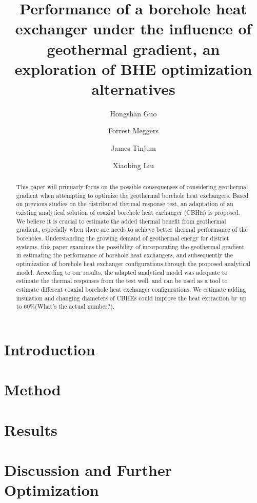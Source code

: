 \documentclass[3p]{elsarticle/elsarticle}
\begin{document}
\begin{frontmatter}
\title{Performance of a borehole heat exchanger under the influence of geothermal gradient, an exploration of BHE optimization alternatives}
\author[Group1]{Hongshan Guo}



\author[Group2]{Forrest Meggers}


\author[Group3]{James Tinjum}
\author[Group4]{Xiaobing Liu}

\address[Group1]{Andlinger Center for Energy and the Environment, Princeton University, Princeton, United States}
\address[Group2]{School of Architecture, Princeton University, Princeton, United States}



\begin{abstract}
This paper will primiarly focus on the possible consequenses of considering geothermal gradient when attempting to optimize the geothermal borehole heat exchangers. Based on previous studies on the distributed thermal response test, an adaptation of an existing analytical solution of coaxial borehole heat exchanger (CBHE) is proposed. We believe it is crucial to estimate the added thermal benefit from geothermal gradient, especially when there are needs to achieve better thermal performance of the boreholes. Understanding the growing demand of geothermal energy for district systems, this paper examines the possibility of incorporating the geothermal gradient in estimating the performance of borehole heat exchangers, and subsequently the optimization of borehole heat exchanger configurations through the proposed analytical model. According to our results, the adapted analytical model was adequate to estimate the thermal responses from the test well, and can be used as a tool to estimate different coaxial borehole heat exchanger configurations. We estimate adding insulation and changing diameters of CBHEs could improve the heat extraction by up to 60\%(What's the actual number?).\end{abstract}

\begin{keyword}

\end{keyword}

\end{frontmatter}
\tableofcontents
\section{Introduction}

\section{Method}
	
	
\section{Results}
	
\section{Discussion and Further Optimization}
	

\renewcommand\refname{References}

\end{document}
